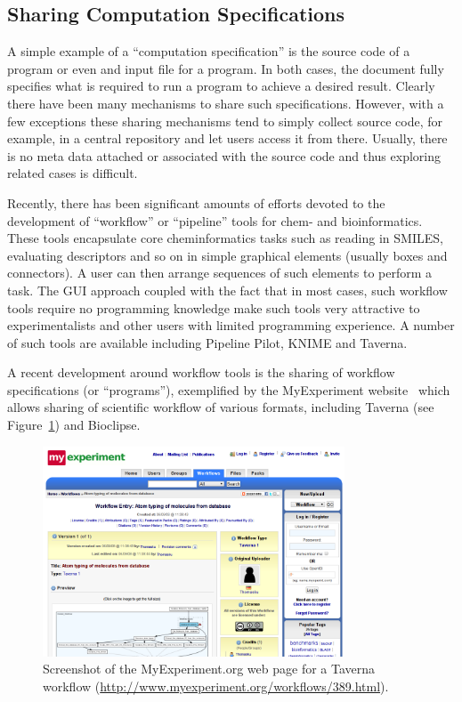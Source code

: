 \documentclass[12pt]{book}
\begin{document}
\subsection{Sharing Computation Specifications}

A simple example of a ``computation specification'' is the source code
of a program or even and input file for a program. In both cases, the
document fully specifies what is required to run a program to achieve
a desired result. Clearly there have been many mechanisms to share
such specifications. However, with a few exceptions these sharing
mechanisms tend to simply collect source code, for example, in a
central repository and let users access it from there. Usually, there
is no meta data attached or associated with the source code and thus
exploring related cases is difficult.

Recently, there has been significant amounts of efforts devoted to the
development of ``workflow'' or ``pipeline'' tools for chem- and
bioinformatics. These tools encapsulate core cheminformatics tasks
such as reading in SMILES, evaluating descriptors and so on in simple
graphical elements (usually boxes and connectors). A user can then
arrange sequences of such elements to perform a task. The GUI approach
coupled with the fact that in most cases, such workflow tools require
no programming knowledge make such tools very attractive to
experimentalists and other users with limited programming
experience. A number of such tools are available including Pipeline
Pilot, KNIME and Taverna.

A recent development around workflow tools is the sharing of workflow
specifications (or ``programs''), exemplified by the MyExperiment
website~\cite{Goble2010} which allows sharing of scientific workflow
of various formats, including Taverna (see Figure~\ref{fig:myexperiment})
and Bioclipse.

\begin{figure}
\begin{center}
\includegraphics[width=0.8\textwidth]{graphics/myexperiment.png}
\end{center}
\caption{Screenshot of the MyExperiment.org web page for a
Taverna workflow (\url{http://www.myexperiment.org/workflows/389.html}).}
\label{fig:myexperiment}
\end{figure}
\end{document}
